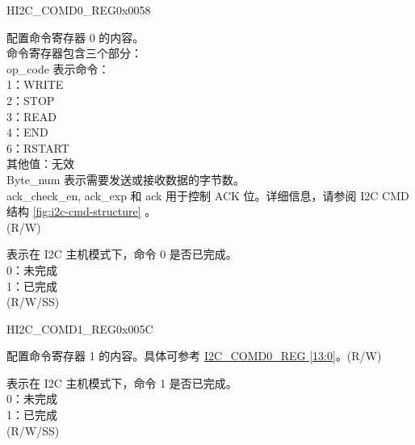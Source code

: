 \begin{register}{H}{I2C\_COMD0\_REG}{0x0058}\label{regdesc:I2CCOMD0REG}
%
%
%
\regnewline%
\begin{regdesc}\begin{reglist}
\label{fielddesc:I2CCOMMAND0}\item [I2C\_COMMAND0] 配置命令寄存器 0 的内容。 \\
命令寄存器包含三个部分：\\ 
op\_code 表示命令：\\
1：WRITE\\
2：STOP\\
3：READ\\
4：END\\
6：RSTART\\
其他值：无效\\
Byte\_num 表示需要发送或接收数据的字节数。\\
ack\_check\_en, ack\_exp 和 ack 用于控制 ACK 位。详细信息，请参阅 I2C CMD 结构 \ref{fig:i2c-cmd-structure} 。\\(R/W)
\label{fielddesc:I2CCOMMAND0DONE}\item [I2C\_COMMAND0\_DONE] 表示在 I2C 主机模式下，命令 0 是否已完成。\\
0：未完成\\
1：已完成 \\ (R/W/SS)
\end{reglist}\end{regdesc}
\end{register}


\begin{register}{H}{I2C\_COMD1\_REG}{0x005C}\label{regdesc:I2CCOMD1REG}
%
%
%
\regnewline%
\begin{regdesc}\begin{reglist}
\label{fielddesc:I2CCOMMAND1}\item [I2C\_COMMAND1] 配置命令寄存器 1 的内容。具体可参考 \hyperref[regdesc:I2CCOMD0REG]{I2C\_COMD0\_REG [13:0]}。(R/W)
\label{fielddesc:I2CCOMMAND1DONE}\item [I2C\_COMMAND1\_DONE] 表示在 I2C 主机模式下，命令 1 是否已完成。\\
0：未完成\\
1：已完成 \\ (R/W/SS)
\end{reglist}\end{regdesc}
\end{register}



